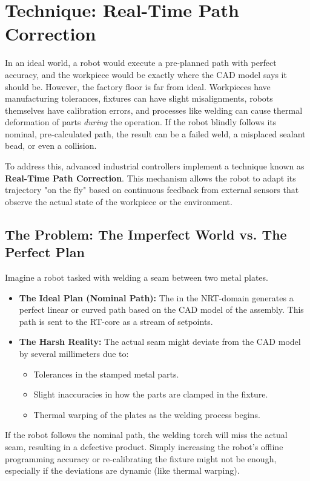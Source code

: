 
\section{Technique: Real-Time Path Correction}
\label{sec:path_correction}

In an ideal world, a robot would execute a pre-planned path with perfect accuracy, and the workpiece would be exactly where the CAD model says it should be. However, the factory floor is far from ideal. Workpieces have manufacturing tolerances, fixtures can have slight misalignments, robots themselves have calibration errors, and processes like welding can cause thermal deformation of parts \textit{during} the operation. If the robot blindly follows its nominal, pre-calculated path, the result can be a failed weld, a misplaced sealant bead, or even a collision.

To address this, advanced industrial controllers implement a technique known as \textbf{Real-Time Path Correction}. This mechanism allows the robot to adapt its trajectory "on the fly" based on continuous feedback from external sensors that observe the actual state of the workpiece or the environment.

\subsection{The Problem: The Imperfect World vs. The Perfect Plan}
\label{subsec:path_correction_problem}

Imagine a robot tasked with welding a seam between two metal plates.
\begin{itemize}
    \item \textbf{The Ideal Plan (Nominal Path):} The  in the NRT-domain generates a perfect linear or curved path based on the CAD model of the assembly. This path is sent to the RT-core as a stream of setpoints.
    \item \textbf{The Harsh Reality:} The actual seam might deviate from the CAD model by several millimeters due to:
        \begin{itemize}
            \item Tolerances in the stamped metal parts.
            \item Slight inaccuracies in how the parts are clamped in the fixture.
            \item Thermal warping of the plates as the welding process begins.
        \end{itemize}
\end{itemize}
If the robot follows the nominal path, the welding torch will miss the actual seam, resulting in a defective product. Simply increasing the robot's offline programming accuracy or re-calibrating the fixture might not be enough, especially if the deviations are dynamic (like thermal warping).

